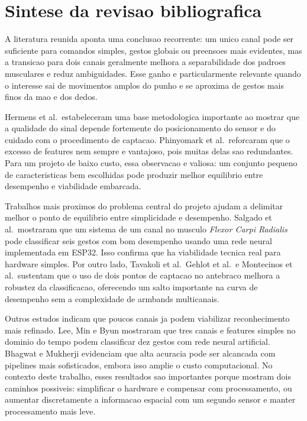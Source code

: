 \documentclass[12pt,oneside,a4paper,english,brazilian]{abntex2}
\begin{document}
\section{Sintese da revisao bibliografica}

A literatura reunida aponta uma conclusao recorrente: um unico canal pode ser suficiente para comandos simples, gestos globais ou preensoes mais evidentes, mas a transicao para dois canais geralmente melhora a separabilidade dos padroes musculares e reduz ambiguidades. Esse ganho e particularmente relevante quando o interesse sai de movimentos amplos do punho e se aproxima de gestos mais finos da mao e dos dedos.

Hermens et al.\ estabeleceram uma base metodologica importante ao mostrar que a qualidade do sinal depende fortemente do posicionamento do sensor e do cuidado com o procedimento de captacao. Phinyomark et al.\ reforcaram que o excesso de features nem sempre e vantajoso, pois muitas delas sao redundantes. Para um projeto de baixo custo, essa observacao e valiosa: um conjunto pequeno de caracteristicas bem escolhidas pode produzir melhor equilibrio entre desempenho e viabilidade embarcada.

Trabalhos mais proximos do problema central do projeto ajudam a delimitar melhor o ponto de equilibrio entre simplicidade e desempenho. Salgado et al.\ mostraram que um sistema de um canal no musculo \textit{Flexor Carpi Radialis} pode classificar seis gestos com bom desempenho usando uma rede neural implementada em ESP32. Isso confirma que ha viabilidade tecnica real para hardware simples. Por outro lado, Tavakoli et al.\, Gehlot et al.\ e Montecinos et al.\ sustentam que o uso de dois pontos de captacao no antebraco melhora a robustez da classificacao, oferecendo um salto importante na curva de desempenho sem a complexidade de armbands multicanais.

Outros estudos indicam que poucos canais ja podem viabilizar reconhecimento mais refinado. Lee, Min e Byun mostraram que tres canais e features simples no dominio do tempo podem classificar dez gestos com rede neural artificial. Bhagwat e Mukherji evidenciam que alta acuracia pode ser alcancada com pipelines mais sofisticados, embora isso amplie o custo computacional. No contexto deste trabalho, esses resultados sao importantes porque mostram dois caminhos possiveis: simplificar o hardware e compensar com processamento, ou aumentar discretamente a informacao espacial com um segundo sensor e manter processamento mais leve.
\end{document}
